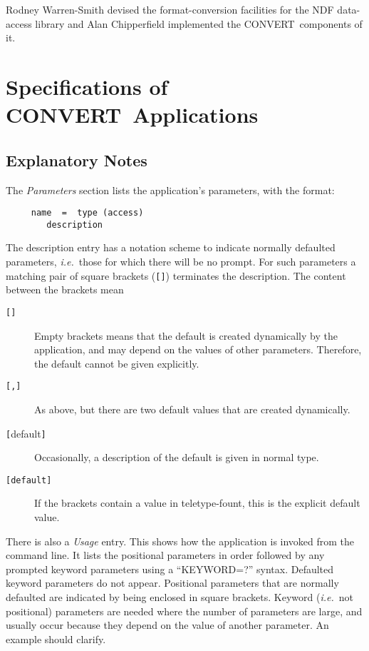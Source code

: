 \documentclass[twoside,11pt]{article}
\newcommand{\xlabel}[1]{}
\newcommand{\CONVERT}{{\footnotesize CONVERT}}
\newcommand{\BCONVERT}{{\normalsize CONVERT}}
\begin{document}
Rodney Warren-Smith devised the format-conversion facilities for the NDF 
data-access library and Alan Chipperfield implemented the \CONVERT\ components
of it.

\newpage
\appendix

\section[Specifications of {\small \bf CONVERT} Applications]
{\label{app_full}Specifications of \BCONVERT\ Applications}
\subsection{\xlabel{explanatory_notes}Explanatory Notes}

The {\em Parameters\/} section \label{app_parameters}
lists the application's parameters, with the format:

\begin{verbatim}
     name  =  type (access)
        description
\end{verbatim}

The description entry has a notation scheme to indicate 
normally defaulted parameters, {\it i.e.}\ those for which there will
be no prompt.
For such parameters a matching pair of square brackets (\verb![]!)
terminates the description.  The content between the brackets mean
\begin{description}
\item[\texttt{[]}]
Empty brackets means that the default is created dynamically
by the application, and may depend on the values of other parameters.
Therefore, the default cannot be given explicitly.
\item[\texttt{[,]}]
As above, but there are two default values that are created dynamically.
\item[\texttt{[}{\rm default}\texttt{]}]
Occasionally, a description of the default is given in normal type.
\item[\texttt{[default]}]
If the brackets contain a value in teletype-fount, this is the explicit
default value.
\end{description}

There is also a {\em Usage\/} entry.   \label{app_usage}
This shows how the  application is invoked from the command line.   It
lists the positional parameters in order followed by any prompted
keyword parameters using  a \mbox{``KEYWORD=?''} syntax.  Defaulted
keyword parameters do not appear.  Positional parameters that are
normally defaulted are indicated by being enclosed in square brackets.  
Keyword ({\it i.e.}\ not positional) parameters are needed where the
number of parameters are large, and usually occur because they depend on
the value of another parameter.  An example should clarify.
\smallskip
\end{document}
